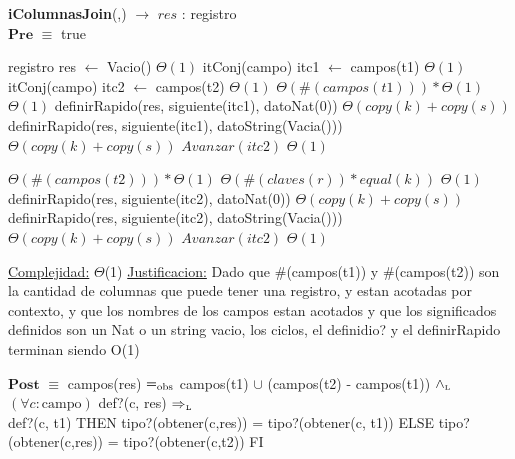 \begin{algorithm}[H]{\textbf{iColumnasJoin}(,) $\to$ $res$ : registro }
		{\\ $\textbf{Pre}$ $\equiv$  true }
    	\begin{algorithmic}[1]
			\State registro res $\gets$ Vacio()								\Comment $\Theta(1)$
			\State itConj(campo) itc1 $\gets$ campos(t1)				\Comment $\Theta(1)$
			\State itConj(campo) itc2 $\gets$ campos(t2)				\Comment $\Theta(1)$
			               								\Comment $\Theta(\#(campos(t1))) * \Theta(1)$
												\Comment $\Theta(1)$
					\State definirRapido(res, siguiente(itc1), datoNat(0))					\Comment $\Theta(copy(k)+copy(s))$
				\Else		
					\State definirRapido(res, siguiente(itc1), datoString(Vacia()))	    \Comment $\Theta(copy(k)+copy(s))$
				\EndIf	
				\State $Avanzar(itc2)$	                     						\Comment $\Theta(1)$			
			\EndWhile

			               								\Comment $\Theta(\#(campos(t2))) * \Theta(1)$
								 	\Comment $\Theta(\#(claves(r)) * equal(k) )$
												\Comment $\Theta(1)$
							\State definirRapido(res, siguiente(itc2), datoNat(0))			  \Comment $\Theta(copy(k)+copy(s))$
						\Else
							\State definirRapido(res, siguiente(itc2), datoString(Vacia())) \Comment $\Theta(copy(k)+copy(s))$
						\EndIf	
	   				\EndIf			 
			 	\State $Avanzar(itc2)$	                     											 	\Comment $\Theta(1)$
			 \EndWhile 

			\medskip
			\Statex \underline{Complejidad:}  $\Theta$(1)
			\Statex \underline{Justificacion:} Dado que \#(campos(t1)) y \#(campos(t2)) son la cantidad de columnas que puede tener una registro, y estan acotadas por contexto, y que los nombres de los campos estan acotados y que los significados definidos son un Nat o un string vacio, los ciclos, el definidio? y el definirRapido terminan siendo O(1)
    	\end{algorithmic}
	   {$\textbf{Post}$ $\equiv$  campos(res) $=_{\mathrm{obs}}$ campos(t1) $\cup$ (campos(t2) - campos(t1))  $\land_{\mathrm{\scriptscriptstyle{L}}}$
	   $(\forall c:\text{campo})$  def?(c, res) $\Rightarrow_{\mathrm{\scriptscriptstyle{L}}}$ \\ \IF def?(c, t1) THEN tipo?(obtener(c,res)) = tipo?(obtener(c, t1)) ELSE tipo?(obtener(c,res)) = tipo?(obtener(c,t2)) FI    }
\end{algorithm}




